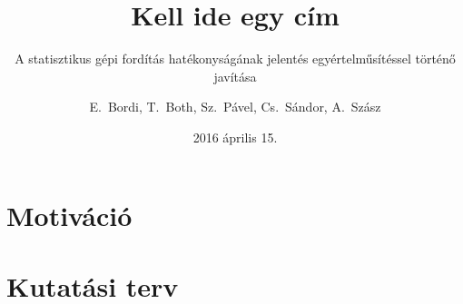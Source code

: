 \documentclass{beamer}
\title{Kell ide egy cím}
\subtitle{A statisztikus gépi fordítás hatékonyságának jelentés egyértelműsítéssel történő javítása}
\author{E.~Bordi, T.~Both, Sz.~Pável, Cs.~Sándor, A.~Szász}
\institute[Babe\c{s}-Bolyai Tudományegyetem] %
{Babe\c{s}-Bolyai Tudományegyetem, Matematika és Informatika Kar, Kolozsvár}
\date{2016 április 15.}
\begin{document}


\section{Motiváció}

\section{Kutatási terv}







%
%
%
%
\end{document}
